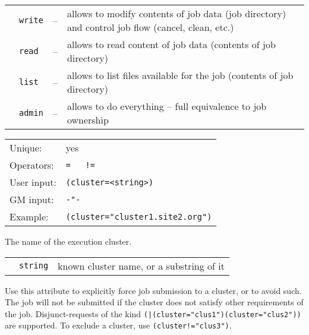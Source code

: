   \begin{tabular}{llll}
    \hspace*{1cm}&\texttt{write}&--&\parbox[t]{11cm}{allows to modify contents of job data (job directory) and control job flow (cancel, clean, etc.)}\\
    \hspace*{1cm}&\texttt{read}&--&\parbox[t]{11cm}{allows to read content of job data
    (contents of job directory)}\\
    \hspace*{1cm}&\texttt{list}&--&\parbox[t]{11cm}{allows to list files available for
    the job (contents of job directory)}\\
    \hspace*{1cm}&\texttt{admin}&--&\parbox[t]{11cm}{allows to do everything --
    full equivalence to job ownership}\\
  \end{tabular}

  \hspace*{0.5cm}
  \begin{shaded}
  \end{shaded}
  \begin{tabular}{lp{13cm}}
    Unique:&yes\\
    Operators:&\verb#=   !=#\\
    User input:&\verb#(cluster=<string>)#\\
    GM input:&\verb#-"-#\\
    Example:&\verb#(cluster="cluster1.site2.org")#\\
  \end{tabular}

  The name of the execution cluster.

  \begin{tabular}{llp{10cm}}
    \hspace*{1cm}&\texttt{string} & known cluster name, or a substring of it\\
  \end{tabular}

  Use this attribute to explicitly force job submission to a cluster,
  or to avoid such. The job will not be submitted if the cluster does
  not satisfy other requirements of the job. Disjunct-requests of the
  kind \verb#(|(cluster="clus1")(cluster="clus2"))# are supported. To
  exclude a cluster, use \verb#(cluster!="clus3")#.

